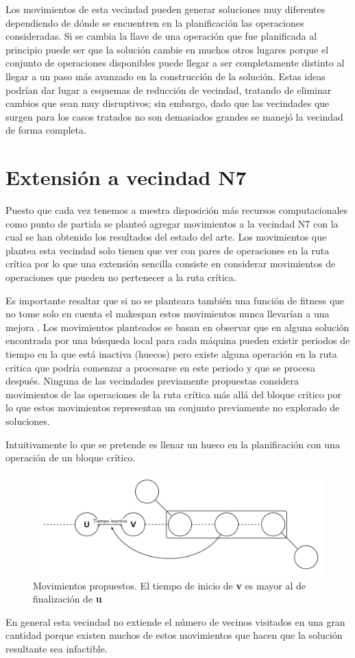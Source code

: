 Los movimientos de esta vecindad pueden generar soluciones muy diferentes dependiendo de dónde se encuentren en la planificación las operaciones consideradas. 
%
Si se cambia la llave de una operación que fue planificada al principio puede ser que la solución cambie en muchos otros lugares porque el conjunto de operaciones 
disponibles puede llegar a ser completamente distinto al llegar a un paso más avanzado en la construcción de la solución. 
%
Estas ideas podrían dar lugar a esquemas de reducción de vecindad, tratando de eliminar cambios que sean muy disruptivos;
%
sin embargo, dado que las vecindades que surgen para los casos tratados no son demasiados grandes se manejó la vecindad de forma completa.

\section{Extensión a vecindad N7}

Puesto que cada vez tenemos a nuestra disposición más recursos computacionales como punto de partida se planteó agregar movimientos a la vecindad N7 
con la cual se han obtenido los resultados del estado del arte.
%
Los movimientos que plantea esta vecindad solo tienen que ver con pares de operaciones en la ruta crítica por lo que una extensión sencilla consiste en 
considerar movimientos de operaciones que pueden no pertenecer a la ruta crítica. 

Es importante resaltar que si no se planteara también una función de fitness que no tome solo en cuenta el makespan estos movimientos nunca llevarían 
a una mejora \cite{blazewicz1996job}.
%
Los movimientos planteados se basan en observar que en alguna solución encontrada por una búsqueda local para cada máquina pueden existir periodos de tiempo en la 
que está inactiva (huecos) pero existe alguna operación en la ruta critica que podría comenzar a procesarse en este periodo y que se procesa después. 
%
Ninguna de las vecindades previamente propuestas considera movimientos de las operaciones de la ruta crítica más allá del bloque crítico por lo que estos movimientos 
representan un conjunto previamente no explorado de soluciones.

Intuitivamente lo que se pretende es llenar un hueco en la planificación con una operación de un bloque crítico.

\begin{figure}[H]
\centering
\includegraphics[scale=.7]{Imagenes/N8.pdf}
    \caption{Movimientos propuestos. El tiempo de inicio de \textbf{v} es mayor al de finalización de \textbf{u}}
\end{figure}

En general esta vecindad no extiende el número de vecinos visitados en una gran cantidad porque existen muchos de estos movimientos que hacen que la solución 
resultante sea infactible. 
